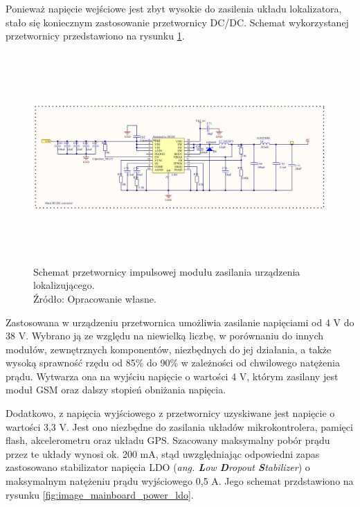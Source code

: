 Ponieważ napięcie wejściowe jest zbyt wysokie do zasilenia układu lokalizatora, stało się koniecznym zastosowanie przetwornicy DC/DC. Schemat wykorzystanej przetwornicy przedstawiono na rysunku \ref{fig:image_mainboard_power_converter}.

\begin{figure}[H]
	\centering
	\includegraphics[width=17cm, height=8cm]{img/schematics/mainboard_power_converter.jpg}
	\caption{Schemat przetwornicy impulsowej modułu zasilania urządzenia lokalizującego. \\ Źródło: Opracowanie własne.}
	\label{fig:image_mainboard_power_converter}
\end{figure}

Zastosowana w urządzeniu przetwornica umożliwia zasilanie napięciami od 4 V do 38 V. Wybrano ją ze względu na niewielką liczbę, w porównaniu do innych modułów, zewnętrznych komponentów, niezbędnych do jej działania, a także wysoką sprawność rzędu od 85\% do 90\% w zależności od chwilowego natężenia prądu. Wytwarza ona na wyjściu napięcie o wartości 4 V, którym zasilany jest moduł GSM oraz dalszy stopień obniżania napięcia.

Dodatkowo, z napięcia wyjściowego z przetwornicy uzyskiwane jest napięcie o wartości 3,3 V. Jest ono niezbędne do zasilania układów mikrokontrolera, pamięci flash, akcelerometru oraz układu GPS. Szacowany maksymalny pobór prądu przez te układy wynosi ok. 200 mA, stąd uwzględniając odpowiedni zapas zastosowano stabilizator napięcia LDO (\textit{ang. \textbf{L}ow \textbf{D}ropout \textbf{S}tabilizer}) o maksymalnym natężeniu prądu wyjściowego 0,5 A. Jego schemat przdstawiono na rysunku \ref{fig:image_mainboard_power_ldo}.

